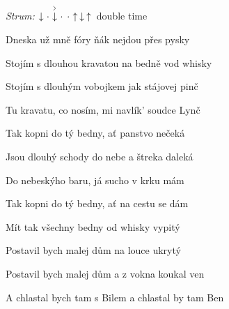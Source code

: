 \begin{song}


\begin{headerbox}
\RaiseBoxWithAccents
{} \quad
\textit{Strum:} $\Down\Miss\AccentDown\Miss\Miss\Up\Down\Up$ double time \quad
\end{headerbox}

\begin{hchordbox}
\end{hchordbox}

\Large

\bigskip

Dneska už mně fóry ňák nejdou přes pysky \par
{}Stojím s dlouhou kravatou na bedně vod whisky \par
{}Stojím s dlouhým vobojkem jak stájovej pinč \par
Tu kravatu, co nosím, mi navlík' soudce Lynč \par

\bigskip

\begin{chorusboxwide}{\Refren}
Tak kopni do tý bedny, ať panstvo nečeká \par
Jsou dlouhý schody do nebe a štreka daleká \par
Do nebeskýho baru, já sucho v krku mám \par
Tak kopni do tý bedny, ať na cestu se dám \par
{}\par
\end{chorusboxwide}

\bigskip

Mít tak všechny bedny od whisky vypitý \par
{}Postavil bych malej dům na louce ukrytý \par
{}Postavil bych malej dům a z vokna koukal ven \par
A chlastal bych tam s Bilem a chlastal by tam Ben \par


\end{song}
